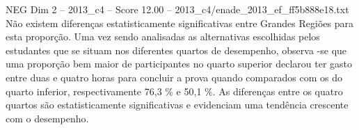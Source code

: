 \begin{textsample}{NEG Dim 2 – 2013\_c4 – Score 12.00 – 2013\_c4/enade\_2013\_ef\_ff5b888e18.txt}
Não existem diferenças estatisticamente significativas entre Grandes Regiões para esta proporção.
Uma vez sendo analisadas as alternativas escolhidas pelos estudantes que se situam nos diferentes quartos de desempenho, observa -se que uma proporção bem maior de participantes no quarto superior declarou ter gasto entre duas e quatro horas para concluir a prova quando comparados com os do quarto inferior, respectivamente 76,3 \% e 50,1 \%.
As diferenças entre os quatro quartos são estatisticamente significativas e evidenciam uma tendência crescente com o desempenho.

\end{textsample}
